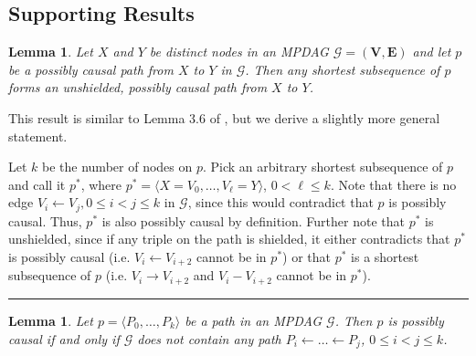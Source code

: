 \documentclass[twoside]{article}
\newtheorem{lemma}[theorem]{Lemma}
\newcommand{\mb}[1]{\mathbf{#1}}
\newcommand{\g}[1][G]{\mathcal{#1}}
\newenvironment{proofof}[1][]{\begin{trivlist}
\item[\hskip \labelsep {\bfseries Proof of #1.}]}{\hfill\BlackBox\end{trivlist}}
\newcommand{\BlackBox}{\rule{1.5ex}{1.5ex}}
\begin{document}

\subsection{Supporting Results}

\begin{lemma}
\label{lem:shortest-subseq}
    Let $X$ and $Y$ be distinct nodes in an MPDAG $\g=(\mb{V},\mb{E})$ and let $p$ be a possibly causal path from $X$ to $Y$ in $\g$. Then any shortest subsequence of $p$ forms an unshielded, possibly causal path from $X$ to $Y$. 
\end{lemma}


\begin{proofof}[Lemma \ref{lem:shortest-subseq}]
    This result is similar to Lemma 3.6 of \cite{perkovic2017interpreting}, but we derive a slightly more general statement.
    
    Let $k$ be the number of nodes on $p$. Pick an arbitrary shortest subsequence of $p$ and call it $p^*$, where $p^*=\langle X=V_0, \dots, V_\ell=Y \rangle$, $0 < \ell \le k$. Note that there is no edge $V_i \gets V_j, 0 \le i < j \le k$ in $\g$, since this would contradict that $p$ is possibly causal. Thus, $p^*$ is also possibly causal by definition. Further note that $p^*$ is unshielded, since if any triple on the path is shielded, it either contradicts that $p^*$ is possibly causal (i.e. $V_i \gets V_{i+2}$ cannot be in $p^*$) or that $p^*$ is a shortest subsequence of $p$ (i.e. $V_i \to V_{i+2}$ and $V_i - V_{i+2}$ cannot be in $p^*$).
\end{proofof}


\begin{lemma} 
\label{lem:nobackpaths}
    Let $p=\langle P_0, \dots, P_k \rangle$ be a path in an MPDAG $\g$. Then $p$ is possibly causal if and only if $\g$ does not contain any path $P_i \gets \dots \gets P_j$, $0 \le i < j \le k$.
\end{lemma}
\end{document}
